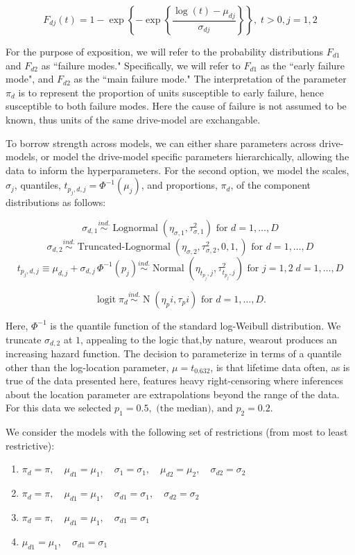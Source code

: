 \documentclass[12pt]{article}
\newcommand{\ind}{\stackrel{ind.}{\sim}}
\newcommand{\op}{\operatorname}
\begin{document}
$$F_{dj}(t) = 1 - \exp \left\{ -\exp \left\{ \frac{ \log (t) - \mu_{dj}}{\sigma_{dj}} \right\} \right\},\; t>0, j=1,2$$

For the purpose of exposition, we will refer to the probability distributions $F_{d1}$ and $F_{d2}$ as ``failure modes." Specifically, we will refer to $F_{d1}$ as the ``early failure mode", and $F_{d2}$ as the ``main failure mode." The interpretation of the parameter $\pi_d$ is to represent the proportion of units susceptible to early failure, hence susceptible to both failure modes. Here the cause of failure is not assumed to be known, thus units of the same drive-model are exchangable.

To borrow strength across models, we can either share parameters across drive-models, or model the drive-model specific parameters hierarchically, allowing the data to inform the hyperparameters. For the second option, we model the scales, $\sigma_j$, quantiles, $t_{p_j,d,j} = \Phi^{-1}(\mu_j)$, and proportions, $\pi_d$, of the component distributions as follows:

$$\sigma_{d,1} \ind \op{Lognormal} \left( \eta_{\sigma,1}, \tau^2_{\sigma,1} \right) \mbox{ for } d=1,\ldots,D$$
$$\sigma_{d,2} \ind \op{Truncated-Lognormal} \left( \eta_{\sigma,2}, \tau^2_{\sigma,2} , 0, 1, \right) \mbox{ for } d=1,\ldots,D$$
$$t_{p_j,d,j} \equiv \mu_{d,j} + \sigma_{d,j}\,\Phi^{-1}(p_j)  \ind \op{Normal} \left(\eta_{t_{p_j},j}, \tau^2_{t_{p_j},j}\right) \mbox{ for } j=1,2\; d=1,\ldots,D$$

$$\op{logit} \pi_d \ind \op{N}(\eta_pi, \tau_pi) \mbox{ for } d=1,\ldots,D.$$

Here, $\Phi^{-1}$ is the quantile function of the standard log-Weibull distribution. We truncate $\sigma_{d,2}$ at $1$, appealing to the logic that,by nature, wearout produces an increasing hazard function. The decision to parameterize in terms of a quantile other than the log-location parameter, $\mu = t_{0.632}$, is that lifetime data often, as is true of the data presented here, features heavy right-censoring where inferences about the location parameter are extrapolations beyond the range of the data. For this data we selected $p_1=0.5,\mbox{ (the median), and } p_2 = 0.2$.

We consider the models with the following set of restrictions (from most to least restrictive):

\begin{enumerate}
\item $\pi_{d} = \pi,\quad \mu_{d1} = \mu_1,\quad \sigma_{1}=\sigma_1,\quad \mu_{d2} = \mu_2,\quad \sigma_{d2} = \sigma_2$
\item $\pi_{d} = \pi,\quad \mu_{d1} = \mu_1,\quad \sigma_{d1}=\sigma_1,\quad \sigma_{d2} = \sigma_2$
\item $\pi_{d} = \pi,\quad \mu_{d1} = \mu_1,\quad \sigma_{d1}=\sigma_1$
\item $\mu_{d1} = \mu_1,\quad \sigma_{d1}=\sigma_1$
\end{enumerate}
\end{document}
